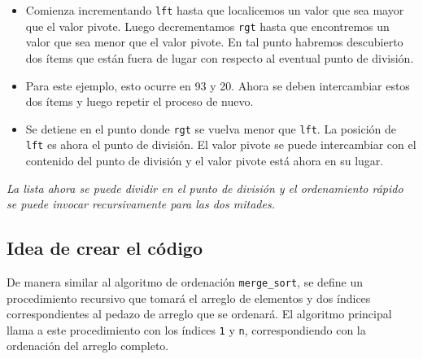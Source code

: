 \begin{itemize}
    \item Comienza incrementando \texttt{lft} hasta que localicemos un valor que sea mayor que el valor pivote. Luego decrementamos \texttt{rgt} hasta que encontremos un valor que sea menor que el valor pivote. En tal punto habremos descubierto dos ítems que están fuera de lugar con respecto al eventual punto de división. 
    \item Para este ejemplo, esto ocurre en 93 y 20. Ahora se deben intercambiar estos dos ítems y luego repetir el proceso de nuevo.
    \item Se detiene en el punto donde \texttt{rgt} se vuelva menor que \texttt{lft}. La posición de \texttt{lft} es ahora el punto de división. El valor pivote se puede intercambiar con el contenido del punto de división y el valor pivote está ahora en su lugar.
\end{itemize}
\textit{ La lista ahora se puede dividir en el punto de división y el ordenamiento rápido se puede invocar recursivamente para las dos mitades.}

\subsection{Idea de crear el código}
De manera similar al algoritmo de ordenación \texttt{merge\_sort}, se define un procedimiento recursivo que tomará el arreglo de elementos y dos índices correspondientes al pedazo de arreglo que se ordenará. El algoritmo principal llama a este procedimiento con los índices \texttt{1} y \texttt{n}, correspondiendo con la ordenación del arreglo completo.

